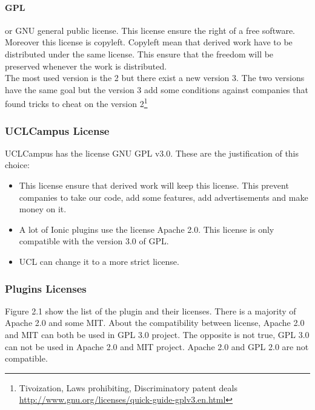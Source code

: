\documentclass{eplmastersthesis}
\begin{document}
\paragraph{GPL}
or GNU general public license. This license ensure the right of a free software. Moreover this license is copyleft. Copyleft mean that derived work have to be distributed under the same license. This ensure that the freedom will be preserved whenever the work is distributed.\\
The most used version is the 2 but there exist a new version 3. The two versions have the same goal but the version 3 add some conditions against companies that found tricks to cheat on the version 2\footnote{Tivoization, Laws prohibiting, Discriminatory patent deals \url{http://www.gnu.org/licenses/quick-guide-gplv3.en.html}}
\subsubsection{UCLCampus License}
UCLCampus has the license GNU GPL v3.0. These are the justification of this choice:
\begin{itemize}
\item This license ensure that derived work will keep this license. This prevent companies to take our code, add some features, add advertisements and make money on it.
\item A lot of Ionic plugins use the license Apache 2.0. This license is only compatible with the version 3.0 of GPL.
\item UCL can change it to a more strict license.
\end{itemize}

\subsubsection{Plugins Licenses}
Figure 2.1 show the list of the plugin and their licenses. There is a majority of Apache 2.0 and some MIT. About the compatibility between license, Apache 2.0 and MIT can both be used in GPL 3.0 project. The opposite is not true, GPL 3.0 can not be used in Apache 2.0 and MIT project. Apache 2.0 and GPL 2.0 are not compatible. 
\end{document}
